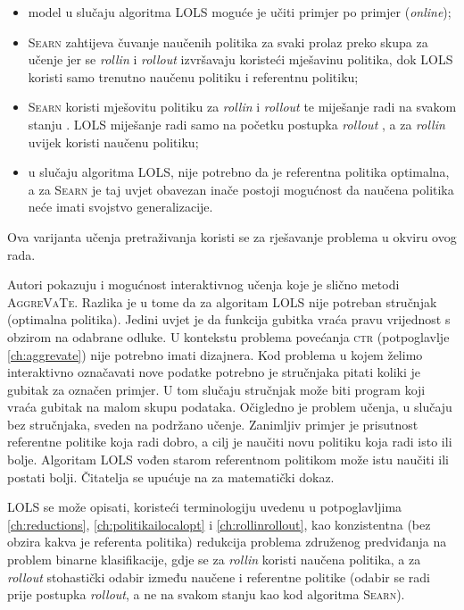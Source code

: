 \begin{itemize}
  \item model u slučaju algoritma \textsc{LOLS} moguće je učiti primjer po
  primjer (\textit{online});

  \item \textsc{Searn} zahtijeva čuvanje naučenih politika za svaki prolaz preko
  skupa za učenje jer se \emph{rollin} i \emph{rollout} izvršavaju koristeći
  mješavinu politika, dok \textsc{LOLS} koristi samo trenutno naučenu politiku i
  referentnu politiku;

  \item \textsc{Searn} koristi mješovitu politiku za \emph{rollin} i
  \emph{rollout} te miješanje radi na svakom stanju .
  \textsc{LOLS} miješanje radi samo na početku postupka \emph{rollout}
  , a za \emph{rollin} uvijek koristi naučenu politiku;

  \item u slučaju algoritma \textsc{LOLS}, nije potrebno da je referentna politika
  optimalna, a za \textsc{Searn} je taj uvjet obavezan inače postoji mogućnost
  da naučena politika neće imati svojstvo generalizacije.

\end{itemize}

\noindent
Ova varijanta učenja pretraživanja koristi se za rješavanje problema u okviru
ovog rada.

Autori pokazuju i mogućnost interaktivnog učenja koje je slično metodi
\textsc{AggreVaTe}. Razlika je u tome da za algoritam \textsc{LOLS} nije
potreban stručnjak (optimalna politika). Jedini uvjet je da funkcija gubitka vraća
pravu vrijednost s obzirom na odabrane odluke. U kontekstu problema povećanja
\textsc{ctr} (potpoglavlje \ref{ch:aggrevate}) nije potrebno imati dizajnera.
Kod problema u kojem želimo interaktivno označavati nove podatke potrebno je
stručnjaka pitati koliki je gubitak za označen primjer. U tom slučaju stručnjak
može biti program koji vraća gubitak na malom skupu podataka. Očigledno je
problem učenja, u slučaju bez stručnjaka, sveden na podržano učenje. Zanimljiv
primjer je prisutnost referentne politike koja radi dobro, a cilj je naučiti novu
politiku koja radi isto ili bolje. Algoritam \textsc{LOLS} vođen starom
referentnom politikom može istu naučiti ili postati bolji. Čitatelja se upućuje na
\cite{daume15lols} za matematički dokaz.

\textsc{LOLS} se može opisati, koristeći terminologiju uvedenu u potpoglavljima
\ref{ch:reductions}, \ref{ch:politikailocalopt} i \ref{ch:rollinrollout}, kao
konzistentna (bez obzira kakva je referenta politika) redukcija problema
združenog predviđanja na problem binarne klasifikacije, gdje se za
\textit{rollin} koristi naučena politika, a za \textit{rollout} stohastički
odabir između naučene i referentne politike (odabir se radi prije postupka
\textit{rollout}, a ne na svakom stanju kao kod algoritma \textsc{Searn}).
